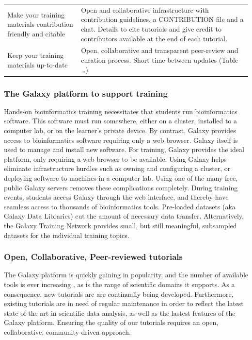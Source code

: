 \documentclass[10pt,letterpaper]{article}
\begin{document}
\begin{table}[h!]
\begin{tabular}{p{}p{}}
		Make your training materials contribution friendly and citable                & Open and collaborative infrastructure with contribution guidelines, a CONTRIBUTION file and a chat. Details to cite tutorials and give credit to contributors available at the end of each tutorial.\\
		Keep your training materials up-to-date                                       & Open, collaborative and transparent peer-review and curation process. Short time between updates (Table …)\\
	\end{tabular}
\end{table}


\subsubsection*{The Galaxy platform to support training}
Hands-on bioinformatics training necessitates that students run bioinformatics software.
This software must run somewhere, either on a cluster, installed to a computer lab, or on the learner's private device.
By contrast, Galaxy provides access to bioinformatics software requiring only a web browser.
Galaxy itself is used to manage and install new software. For training, Galaxy provides the ideal platform, only requiring a web browser to be available.
Using Galaxy helps eliminate infrastructure hurdles such as owning and configuring a cluster, or deploying software to machines in a computer lab. Using one of the many free, public Galaxy servers removes these complications completely.
During training events, students access Galaxy through the web interface, and thereby have seamless access to thousands of bioinformatics tools.
Pre-loaded datasets (aka Galaxy Data Libraries) cut the amount of necessary data transfer.
Alternatively, the Galaxy Training Network provides small, but still meaningful, subsampled datasets for the individual training topics.


\subsubsection*{Open, Collaborative, Peer-reviewed tutorials}
The Galaxy platform is quickly gaining in popularity, and the number of available tools is ever increasing \cite{TODO}, as is the range of scientific domains it supports. As a consequence, new tutorials are are continually being developed.
Furthermore, existing tutorials are in need of regular maintenance in order to reflect the latest state-of-the art in scientific data analysis, as well as the lastest features of the Galaxy platform. Ensuring the quality of our tutorials requires an open, collaborative, community-driven approach.
\end{document}

